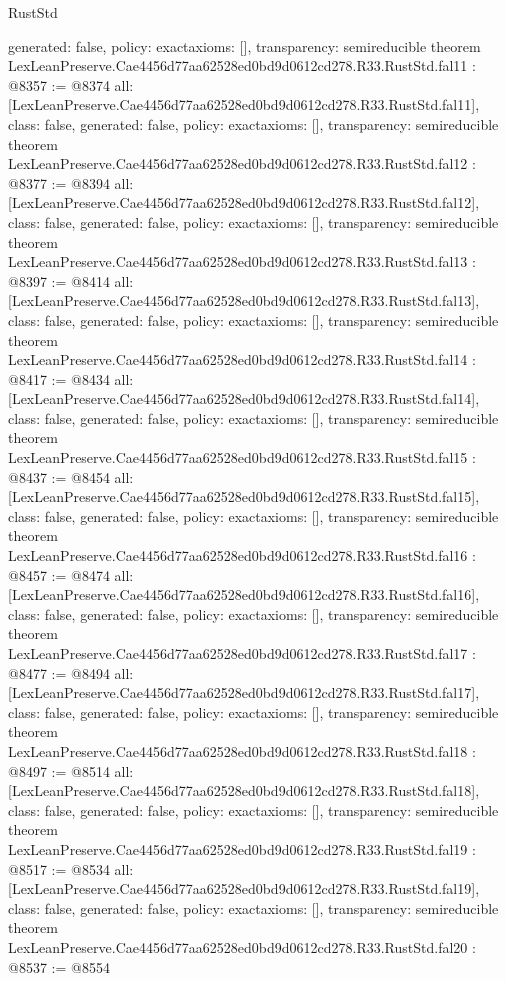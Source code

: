 \begin{lexlean}{RustStd}
\begin{coremodule}
{  generated: false,
  policy: exact{axioms: []},
  transparency: semireducible
}
theorem LexLeanPreserve.Cae4456d77aa62528ed0bd9d0612cd278.R33.RustStd.fal11 : @8357 := @8374 {
  all: [LexLeanPreserve.Cae4456d77aa62528ed0bd9d0612cd278.R33.RustStd.fal11],
  class: false,
  generated: false,
  policy: exact{axioms: []},
  transparency: semireducible
}
theorem LexLeanPreserve.Cae4456d77aa62528ed0bd9d0612cd278.R33.RustStd.fal12 : @8377 := @8394 {
  all: [LexLeanPreserve.Cae4456d77aa62528ed0bd9d0612cd278.R33.RustStd.fal12],
  class: false,
  generated: false,
  policy: exact{axioms: []},
  transparency: semireducible
}
theorem LexLeanPreserve.Cae4456d77aa62528ed0bd9d0612cd278.R33.RustStd.fal13 : @8397 := @8414 {
  all: [LexLeanPreserve.Cae4456d77aa62528ed0bd9d0612cd278.R33.RustStd.fal13],
  class: false,
  generated: false,
  policy: exact{axioms: []},
  transparency: semireducible
}
theorem LexLeanPreserve.Cae4456d77aa62528ed0bd9d0612cd278.R33.RustStd.fal14 : @8417 := @8434 {
  all: [LexLeanPreserve.Cae4456d77aa62528ed0bd9d0612cd278.R33.RustStd.fal14],
  class: false,
  generated: false,
  policy: exact{axioms: []},
  transparency: semireducible
}
theorem LexLeanPreserve.Cae4456d77aa62528ed0bd9d0612cd278.R33.RustStd.fal15 : @8437 := @8454 {
  all: [LexLeanPreserve.Cae4456d77aa62528ed0bd9d0612cd278.R33.RustStd.fal15],
  class: false,
  generated: false,
  policy: exact{axioms: []},
  transparency: semireducible
}
theorem LexLeanPreserve.Cae4456d77aa62528ed0bd9d0612cd278.R33.RustStd.fal16 : @8457 := @8474 {
  all: [LexLeanPreserve.Cae4456d77aa62528ed0bd9d0612cd278.R33.RustStd.fal16],
  class: false,
  generated: false,
  policy: exact{axioms: []},
  transparency: semireducible
}
theorem LexLeanPreserve.Cae4456d77aa62528ed0bd9d0612cd278.R33.RustStd.fal17 : @8477 := @8494 {
  all: [LexLeanPreserve.Cae4456d77aa62528ed0bd9d0612cd278.R33.RustStd.fal17],
  class: false,
  generated: false,
  policy: exact{axioms: []},
  transparency: semireducible
}
theorem LexLeanPreserve.Cae4456d77aa62528ed0bd9d0612cd278.R33.RustStd.fal18 : @8497 := @8514 {
  all: [LexLeanPreserve.Cae4456d77aa62528ed0bd9d0612cd278.R33.RustStd.fal18],
  class: false,
  generated: false,
  policy: exact{axioms: []},
  transparency: semireducible
}
theorem LexLeanPreserve.Cae4456d77aa62528ed0bd9d0612cd278.R33.RustStd.fal19 : @8517 := @8534 {
  all: [LexLeanPreserve.Cae4456d77aa62528ed0bd9d0612cd278.R33.RustStd.fal19],
  class: false,
  generated: false,
  policy: exact{axioms: []},
  transparency: semireducible
}
theorem LexLeanPreserve.Cae4456d77aa62528ed0bd9d0612cd278.R33.RustStd.fal20 : @8537 := @8554 {
}
\end{coremodule}
\end{lexlean}
